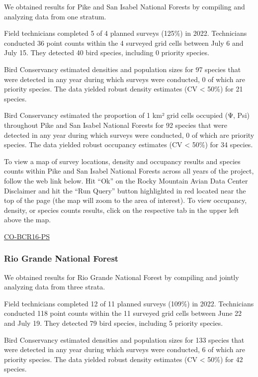 \documentclass[
  letterpaper,
  DIV=11,
  numbers=noendperiod,
  oneside]{scrreprt}
\begin{document}
We obtained results for Pike and San Isabel National Forests by
compiling and analyzing data from one stratum.

Field technicians completed 5 of 4 planned surveys (125\%) in 2022.
Technicians conducted 36 point counts within the 4 surveyed grid cells
between July 6 and July 15. They detected 40 bird species, including 0
priority species.

Bird Conservancy estimated densities and population sizes for 97 species
that were detected in any year during which surveys were conducted, 0 of
which are priority species. The data yielded robust density estimates
(CV \textless{} 50\%) for 21 species.

Bird Conservancy estimated the proportion of 1 km² grid cells occupied
(Ψ, Psi) throughout Pike and San Isabel National Forests for 92 species
that were detected in any year during which surveys were conducted, 0 of
which are priority species. The data yielded robust occupancy estimates
(CV \textless{} 50\%) for 34 species.

To view a map of survey locations, density and occupancy results and
species counts within Pike and San Isabel National Forests across all
years of the project, follow the web link below. Hit ``Ok'' on the Rocky
Mountain Avian Data Center Disclaimer and hit the ``Run Query'' button
highlighted in red located near the top of the page (the map will zoom
to the area of interest). To view occupancy, density, or species counts
results, click on the respective tab in the upper left above the map.

\href{http://www.rmbo.org/new_site/adc/QueryWindow.aspx\#N4IgzgLgTghhCuBbEAuABCAwgeQLQCFMAlARgDZcAFAZXUoEsBrAUzRgDsATNajtASTAwARswA2aAHJx6Ae3YwJAMVlRmkMCAC+QA===}{CO-BCR16-PS}

\hypertarget{rio-grande-national-forest}{%
\subsubsection{Rio Grande National
Forest}\label{rio-grande-national-forest}}

We obtained results for Rio Grande National Forest by compiling and
jointly analyzing data from three strata.

Field technicians completed 12 of 11 planned surveys (109\%) in 2022.
Technicians conducted 118 point counts within the 11 surveyed grid cells
between June 22 and July 19. They detected 79 bird species, including 5
priority species.

Bird Conservancy estimated densities and population sizes for 133
species that were detected in any year during which surveys were
conducted, 6 of which are priority species. The data yielded robust
density estimates (CV \textless{} 50\%) for 42 species.
\end{document}
